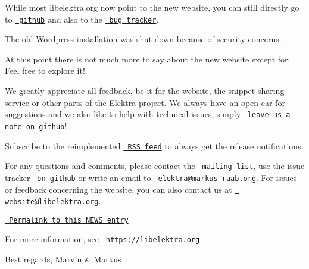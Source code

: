 While most {\ttfamily libelektra.\+org} now point to the new website, you can still directly go to \href{https://git.libelektra.org}{\texttt{ github}} and also to the \href{https://bugs.libelektra.org}{\texttt{ bug tracker}}.

The old Wordpress installation was shut down because of security concerns.

At this point there is not much more to say about the new website except for\+: Feel free to explore it!

We greatly appreciate all feedback, be it for the website, the snippet sharing service or other parts of the Elektra project. We always have an open ear for suggestions and we also like to help with technical issues, simply \href{https://bugs.libelektra.org}{\texttt{ leave us a note on github}}!

Subscribe to the reimplemented \href{https://www.libelektra.org/news/feed.rss}{\texttt{ R\+SS feed}} to always get the release notifications.

For any questions and comments, please contact the \href{https://lists.sourceforge.net/lists/listinfo/registry-list}{\texttt{ mailing list}}, use the issue tracker \href{https://bugs.libelektra.org}{\texttt{ on github}} or write an email to \href{mailto:elektra@markus-raab.org}{\texttt{ elektra@markus-\/raab.\+org}}. For issues or feedback concerning the website, you can also contact us at \href{mailto:website@libelektra.org}{\texttt{ website@libelektra.\+org}}.

\href{https://www.libelektra.org/news/website-release}{\texttt{ Permalink to this N\+E\+WS entry}}

For more information, see \href{https://libelektra.org}{\texttt{ https\+://libelektra.\+org}}

Best regards, Marvin \& Markus 